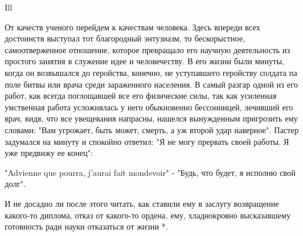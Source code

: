 Ill

От качеств ученого  перейдем к  качествам человека.  Здесь впереди  всех
достоинств  выступал   тот  благородный   энтузиазм,  то   бескорыстное,
самоотверженное отношение, которое  превращало его научную  деятельность
из простого занятия  в служение идее  и человечеству. В  его жизни  были
минуты, когда  он  возвышался  до  геройства,  конечно,  не  уступавшего
геройству солдата па поле битвы или врача среди зараженного населения. В
самый разгар  одной  из  его  работ,  как  всегда  поглощавшей  все  его
физические силы, так как усиленная умственная работа усложнялась у  него
обыкновенно бессонницей,  лечивший его  врач, видя,  что все  увещевания
напрасны, нашелся  вынужденным пригрозить  ему словами:  "Вам  угрожает,
быть может,  смерть, а  уж второй  удар наверное".  Пастер задумался  на
минуту и  спокойно ответил:  "Я не  могу прервать  своей работы.  Я  уже
предвижу ее конец":

"Advienne que pourra, j'aurai fait mondevoir" - "Будь, что будет, я
исполню свой долг".

И  не  досадно  ли  после  этого  читать,  как  ставили  ему  в  заслугу
возвращение  какого-то  диплома,   отказ  от   какого-то  ордена,   ему,
хладнокровно высказавшему готовность ради науки отказаться от жизни *.

